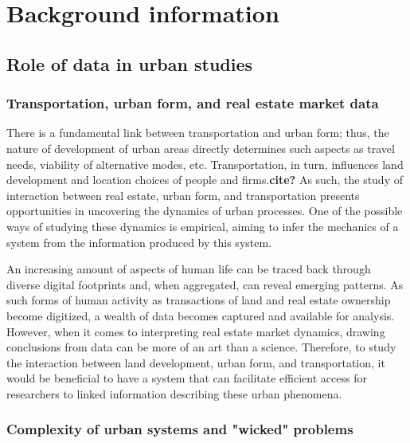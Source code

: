 \chapter[Background]{Background information} \label{ch:background}

\section{Role of data in urban studies} \label{sec:role_of_data_in_urban_studies}

\subsection{Transportation, urban form, and real estate market data} \label{subsec:transportation_urban_form_real_estate_data}

There is a fundamental link between transportation and urban form;
thus, the nature of development of urban areas directly determines such aspects as travel needs, viability of alternative modes, etc.
Transportation, in turn, influences land development and location choices of people and firms.\textbf{cite?}
As such, the study of interaction between real estate, urban form, and transportation presents opportunities in uncovering the dynamics of urban processes.
One of the possible ways of studying these dynamics is empirical, aiming to infer the mechanics of a system from the information produced by this system.

An increasing amount of aspects of human life can be traced back through diverse digital footprints and, when aggregated, can reveal emerging patterns.\cite{Arribas-Bel2014}
As such forms of human activity as transactions of land and real estate ownership become digitized\cite{TeranetEnterprisesInc.}, a wealth of data becomes captured and available for analysis.
However, when it comes to interpreting real estate market dynamics, drawing conclusions from data can be more of an art than a science.\cite{Brett2009}
Therefore, to study the interaction between land development, urban form, and transportation, it would be beneficial to have a system that can facilitate efficient access for researchers to linked information describing these urban phenomena.

\subsection{Complexity of urban systems and "wicked" problems} \label{subsec:complexity_and_wicked_problems}

